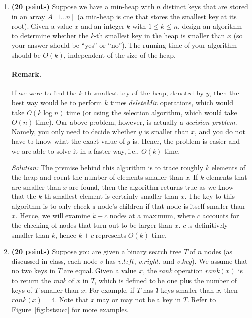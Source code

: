 \documentclass[11pt]{article}
\begin{document}
\begin{enumerate}
\item
{\bf (20 points)}
Suppose we have a min-heap with $n$ distinct keys that are stored in an array $A[1\ldots n]$ (a min-heap is one that stores the smallest key at its root). Given a value $x$ and an integer $k$ with $1\leq k\leq n$, design an algorithm to determine whether the $k$-th smallest key in the heap is smaller than $x$ (so your answer should be ``yes'' or ``no''). The running time of your algorithm should be $O(k)$, independent of the size of the heap.

\vspace{-0.15in}
\paragraph{Remark.} If we were to find the $k$-th smallest key of the heap, denoted by $y$, then the best way would be to perform $k$ times {\em deleteMin} operations, which would take $O(k\log n)$ time (or using the selection algorithm, which would take $O(n)$ time). Our above problem, however, is actually a {\em decision problem}. Namely, you only need to decide whether $y$ is smaller than $x$, and you do not have to know what the exact value of $y$ is. Hence, the problem is easier and we are able to solve it in a faster way, i.e., $O(k)$ time.

\textit{Solution:} The premise behind this algorithm is to trace roughly $k$ elements of the heap and count the number of elements smaller than $x$. If $k$ elements that are smaller than $x$ are found, then the algorithm returns true as we know that the $k$-th smallest element is certainly smaller than $x$. The key to this algorithm is to only check a node's children if that node is itself smaller than $x$. Hence, we will examine $k+c$ nodes at a maximum, where $c$ accounts for the checking of nodes that turn out to be larger than $x$. $c$ is definitively smaller than $k$, hence $k+c$ represents $O(k)$ time.

\item
{\bf (20 points)}
Suppose you are given a binary search tree $T$ of $n$ nodes (as discussed in class, each node $v$ has $v.left$, $v.right$, and $v.key$). We assume that no two keys in $T$ are equal. Given a value $x$, the {\em rank} operation $rank(x)$ is to return the {\em rank} of $x$ in $T$, which is defined to be one plus the number of keys of $T$ smaller than $x$. For example, if $T$ has 3 keys smaller than $x$, then $rank(x)=4$. Note that $x$ may or may not be a key in $T$. Refer to Figure~\ref{fig:bstsucc} for more examples.



\end{enumerate}
\end{document}
